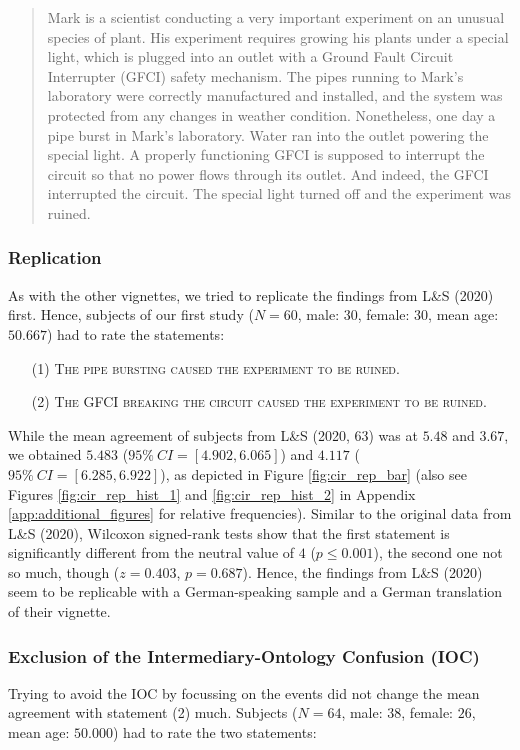 \documentclass[egregdoesnotlikesansseriftitles,12pt]{scrartcl}
\begin{document}
\begin{quote}
   Mark is a scientist conducting a very important experiment on an unusual species of plant. His experiment requires growing his plants under a special light, which is plugged into an outlet with a Ground Fault Circuit Interrupter (GFCI) safety mechanism. The pipes running to Mark's laboratory were correctly manufactured and installed, and the system was protected from any changes in weather condition. Nonetheless, one day a pipe burst in Mark's laboratory. Water ran into the outlet powering the special light. A properly functioning GFCI is supposed to interrupt the circuit so that no power flows through its outlet. And indeed, the GFCI interrupted the circuit. The special light turned off and the experiment was ruined.
\end{quote}

\subsubsection{Replication}\label{sec:results_cir_rep}
As with the other vignettes, we tried to replicate the findings from L\&S (2020) first. Hence, subjects of our first study ($N=60$, male: $30$, female: $30$, mean age: $50.667$) had to rate the statements:

\begin{itemize}
   \item[(1)]\textsc{The pipe bursting caused the experiment to be ruined.}
   \item[(2)]\textsc{The GFCI breaking the circuit caused the experiment to be ruined.}
\end{itemize}

\noindent While the mean agreement of subjects from L\&S (2020, 63) was at $5.48$ and $3.67$, we obtained $5.483$ ($95\%~CI=[4.902,6.065]$) and $4.117$ ($95\%~CI=[6.285,6.922]$), as depicted in Figure \ref{fig:cir_rep_bar} (also see Figures \ref{fig:cir_rep_hist_1} and \ref{fig:cir_rep_hist_2} in Appendix \ref{app:additional_figures} for relative frequencies). Similar to the original data from L\&S (2020), Wilcoxon signed-rank tests show that the first statement is significantly different from the neutral value of $4$ ($p \leq 0.001$), the second one not so much, though ($z=0.403$, $p=0.687$). Hence, the findings from L\&S (2020) seem to be replicable with a German-speaking sample and a German translation of their vignette.

\subsubsection{Exclusion of the Intermediary-Ontology Confusion (IOC)}\label{sec:results_cir_ioc}
Trying to avoid the IOC by focussing on the events did not change the mean agreement with statement (2) much. Subjects ($N=64$, male: $38$, female: $26$, mean age: $50.000$) had to rate the two statements:
\end{document}
